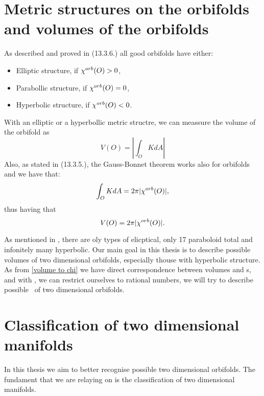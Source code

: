 
\section{Metric structures on the orbifolds and volumes of the orbifolds}
As described and proved in \cite{Thurston1979} (13.3.6.) all good orbifolds have either:
\begin{itemize}
\item Elliptic structure, if ${\chi^{orb}(O)} > 0$,
\item Parabollic structure, if ${\chi^{orb}(O)} = 0$,
\item Hyperbolic structure, if ${\chi^{orb}(O)} < 0$.
\end{itemize}
With an elliptic or a hyperbollic metric structre, we can meassure the volume of the orbifold as 
\begin{equation}
V(O) = |\int_O K dA|
\end{equation} 
Also, as stated in \cite{Thurston1979} (13.3.5.), the Gauss-Bonnet theorem works also for orbifolds 
and we have that:
\begin{equation}
\int_O K dA = 2\pi|{\chi^{orb}(O)}|,
\end{equation}
thus having that 
\begin{equation}\label{volume to chi}
V(O) = 2\pi|{\chi^{orb}(O)}|.
\end{equation}

As mentioned in \cite{}, there are oly types of elicptical, only 17 paraboloid total and infonitely many hyperbolic. 
Our main goal in this thesis is to describe possible volumes of two dimensional orbifolds, 
especially thouse with hyperbolic structure. 
As from \ref{volume to chi} we have direct correspondence 
between volumes and \Eoc s, and with \Eoc, we can restrict ourselves to rational numbers, 
we will try to describe possible \Eoc\ of two dimensional orbifolds.  

\section{Classification of two dimensional manifolds}\label{2 dim manifolds}
In this thesis we aim to better recognise possible two dimensional orbifolds. 
The fundament that we are relaying on is the classification of two dimensional manifolds. 

